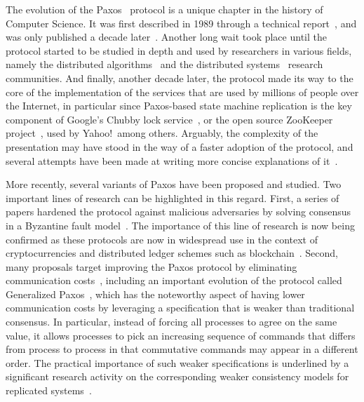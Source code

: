 The evolution of the Paxos~\cite{Lam98} protocol is a unique
chapter in the history of Computer Science. It was first described in
1989 through a technical report~\cite{paxos:tr}, and was only
published a decade later~\cite{Lam98}. Another long wait took
place until the protocol started to be studied in depth and used by
researchers in various fields, namely the distributed
algorithms~\cite{DPLL97} and the distributed systems~\cite{petal}
research communities. And finally, another decade later, the protocol
made its way to the core of the implementation of the services that
are used by millions of people over the Internet, in particular since
Paxos-based state machine replication is the key component of Google's
Chubby lock service~\cite{chubby}, or the open source ZooKeeper
project~\cite{zookeeper}, used by Yahoo!\ among others. Arguably, the
complexity of the presentation may have stood in the way of a faster
adoption of the protocol, and several attempts have been made at
writing more concise explanations of
it~\cite{L01,Renesse2011}.


More recently, several variants of Paxos have been proposed and
studied. Two important lines of research can be highlighted in this
regard. First, a series of papers hardened the protocol against
malicious adversaries by solving consensus in a Byzantine fault
model~\cite{CL99,Lamport2011}. The importance of this line of
research is now being confirmed as these protocols are now in widespread
use in the context of cryptocurrencies and distributed ledger
schemes such as blockchain~\cite{bitcoin}.
Second, many proposals target improving
the Paxos protocol by eliminating communication costs~\cite{L06},
including an important evolution of the protocol called Generalized
Paxos~\cite{Lamport2005}, which has the noteworthy aspect of
having lower communication costs by leveraging a specification that is
weaker than traditional consensus. In particular, instead of forcing all
processes to agree on the same value, it allows processes to pick an
increasing sequence of commands that differs from process to process
in that commutative commands may appear in a different order.
The practical importance of such weaker specifications is underlined
by a significant research activity on the corresponding weaker consistency
models for replicated systems~\cite{LLS90,dynamo}.


